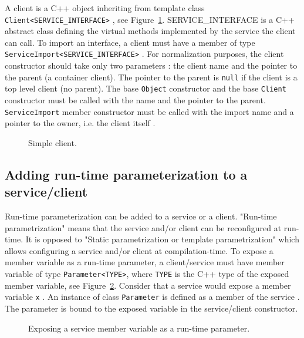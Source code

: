 A client is a C++ object inheriting from template class \texttt{Client<SERVICE\_INTERFACE>} , see Figure~\ref{fig:simple_client}.
SERVICE\_INTERFACE is a C++ abstract class defining the virtual methods implemented by the service the client can call.
To import an interface, a client must have a member of type \texttt{ServiceImport<SERVICE\_INTERFACE>} .
For normalization purposes, the client constructor should take only two parameters : the client name and the pointer to the parent (a container client).
The pointer to the parent is \texttt{null} if the client is a top level client (no parent).
The base \texttt{Object} constructor  and the base \texttt{Client} constructor  must be called with the name and the pointer to the parent.
\texttt{ServiceImport} member constructor must be called with the import name and a pointer to the owner, i.e. the client itself .

\begin{figure}[h]
  \begin{center}
    
    \caption{\label{fig:simple_client} Simple client.}
  \end{center}
\end{figure}

\subsection{Adding run-time parameterization to a service/client}

Run-time parameterization can be added to a service or a client. "Run-time parametrization" means that the service and/or client can be reconfigured at run-time. It is opposed to "Static parametrization or template parametrization" which allows configuring a service and/or client at compilation-time.
To expose a member variable as a run-time parameter, a client/service must have member variable of type \texttt{Parameter<TYPE>}, where \texttt{TYPE} is the C++ type of the exposed member variable, see Figure~\ref{fig:run_time_parameter}. Consider that a service would expose a member variable \texttt{x} . An instance of class \texttt{Parameter} is defined as a member of the service . 
The parameter is bound to the exposed variable  in the service/client constructor.

\begin{figure}[h]
  \begin{center}
    
    \caption{\label{fig:run_time_parameter} Exposing a service member variable as a run-time parameter.}
  \end{center}
\end{figure}

